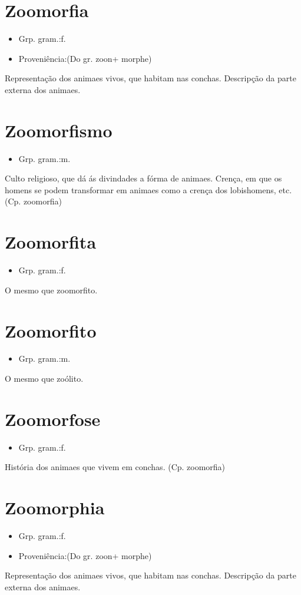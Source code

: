 \section{Zoomorfia}
\begin{itemize}
\item {Grp. gram.:f.}
\end{itemize}
\begin{itemize}
\item {Proveniência:(Do gr. \textunderscore zoon\textunderscore  + \textunderscore morphe\textunderscore )}
\end{itemize}
Representação dos animaes vivos, que habitam nas conchas.
Descripção da parte externa dos animaes.
\section{Zoomorfismo}
\begin{itemize}
\item {Grp. gram.:m.}
\end{itemize}
Culto religioso, que dá ás divindades a fórma de animaes.
Crença, em que os homens se podem transformar em animaes como a crença dos lobishomens, etc.
(Cp. \textunderscore zoomorfia\textunderscore )
\section{Zoomorfita}
\begin{itemize}
\item {Grp. gram.:f.}
\end{itemize}
O mesmo que \textunderscore zoomorfito\textunderscore .
\section{Zoomorfito}
\begin{itemize}
\item {Grp. gram.:m.}
\end{itemize}
O mesmo que \textunderscore zoólito\textunderscore .
\section{Zoomorfose}
\begin{itemize}
\item {Grp. gram.:f.}
\end{itemize}
História dos animaes que vivem em conchas.
(Cp. \textunderscore zoomorfia\textunderscore )
\section{Zoomorphia}
\begin{itemize}
\item {Grp. gram.:f.}
\end{itemize}
\begin{itemize}
\item {Proveniência:(Do gr. \textunderscore zoon\textunderscore  + \textunderscore morphe\textunderscore )}
\end{itemize}
Representação dos animaes vivos, que habitam nas conchas.
Descripção da parte externa dos animaes.
